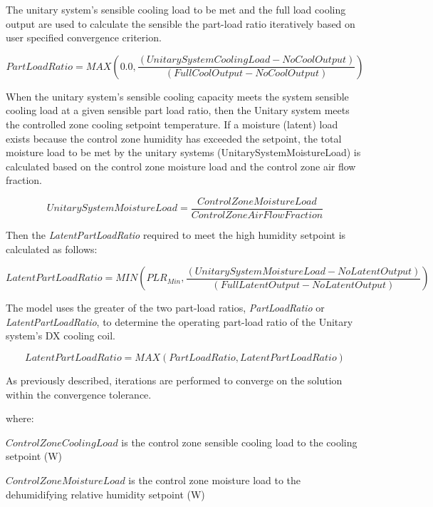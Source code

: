 The unitary system's sensible cooling load to be met and the full load cooling output are used to calculate the sensible the part-load ratio iteratively based on user specified convergence criterion.

\begin{equation}
PartLoadRatio = MAX\left( {0.0,\frac{{\left( {UnitarySystemCoolingLoad - NoCoolOutput} \right)}}{{\left( {FullCoolOutput - NoCoolOutput} \right)}}} \right)
\end{equation}

When the unitary system's sensible cooling capacity meets the system sensible cooling load at a given sensible part load ratio, then the Unitary system meets the controlled zone cooling setpoint temperature. If a moisture (latent) load exists because the control zone humidity has exceeded the setpoint, the total moisture load to be met by the unitary systems (UnitarySystemMoistureLoad) is calculated based on the control zone moisture load and the control zone air flow fraction.

\begin{equation}
UnitarySystemMoistureLoad = \frac{{ControlZoneMoistureLoad}}{{ControlZoneAirFlowFraction}}
\end{equation}

Then the \emph{LatentPartLoadRatio} required to meet the high humidity setpoint is calculated as follows:

\begin{equation}
  LatentPartLoadRatio = MIN\left( {PL{R_{Min}},\frac{{\left( {UnitarySystemMoistureLoad - NoLatentOutput} \right)}}{{\left( {FullLatentOutput - NoLatentOutput} \right)}}} \right)
\end{equation}

The model uses the greater of the two part-load ratios, \emph{PartLoadRatio} or \emph{LatentPartLoadRatio}, to determine the operating part-load ratio of the Unitary system's DX cooling coil.

\begin{equation}
LatentPartLoadRatio = MAX\left( {PartLoadRatio,LatentPartLoadRatio} \right)
\end{equation}

As previously described, iterations are performed to converge on the solution within the convergence tolerance.

where:

\(ControlZoneCoolingLoad\) is the control zone sensible cooling load to the cooling setpoint (W)

\(ControlZoneMoistureLoad\) is the control zone moisture load to the dehumidifying relative humidity setpoint (W)


